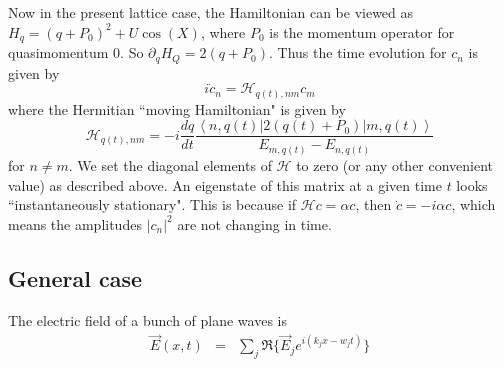 \documentclass[aps,twocolumn,prb,floatfix,amsmath,amssymb,groupedaddress]{revtex4}
\begin{document}
Now in the present lattice case, the Hamiltonian can be viewed as $H_q = (q+P_0)^2 + U\cos(X)$, where $P_0$ is the momentum operator for quasimomentum $0$.  So $\partial_q H_Q = 2(q+P_0)$.  Thus the time evolution for $c_n$ is given by
\begin{equation}
i\dot{c}_n = \mathcal{H}_{q(t),nm}c_m
\end{equation}
where the Hermitian ``moving Hamiltonian" is given by
\begin{equation}
\mathcal{H}_{q(t),nm} = -i\frac{dq}{dt} \frac{\left<n,q(t)\right|2\left(q(t)+P_0\right)\left|m,q(t)\right>}{E_{m,q(t)}-E_{n,q(t)}}
\end{equation}
for $n\neq m$.  We set the diagonal elements of $\mathcal{H}$ to zero (or any other convenient value) as described above.  An eigenstate of this matrix at a given time $t$ looks ``instantaneously stationary".  This is because if $\mathcal{H}c = \alpha c$, then $\dot{c} = -i\alpha c$, which means the amplitudes $|c_n|^2$ are not changing in time.

\subsection{General case}
The electric field of a bunch of plane waves is
\begin{eqnarray*}
\vec{E}(x,t) & = & \sum_j \Re\{\vec{E}_j e^{i(k_j x - w_j t)}\}
\end{eqnarray*}
\end{document}
